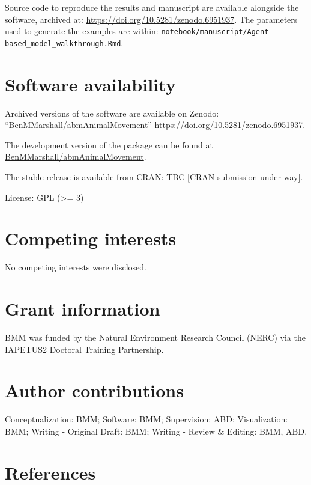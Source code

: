 \documentclass[10pt,a4paper]{article}
\begin{document}
Source code to reproduce the results and manuscript are available alongside the software, archived at: \url{https://doi.org/10.5281/zenodo.6951937}.
The parameters used to generate the examples are within: \texttt{notebook/manuscript/Agent-based\_model\_walkthrough.Rmd}.

\hypertarget{software-availability}{%
\section{Software availability}\label{software-availability}}

Archived versions of the software are available on Zenodo: ``BenMMarshall/abmAnimalMovement'' \url{https://doi.org/10.5281/zenodo.6951937}.

The development version of the package can be found at \href{https://github.com/BenMMarshall/abmAnimalMovement}{BenMMarshall/abmAnimalMovement}.

The stable release is available from CRAN: TBC {[}CRAN submission under way{]}.

License: GPL (\textgreater= 3)

\hypertarget{competing-interests}{%
\section{Competing interests}\label{competing-interests}}

No competing interests were disclosed.

\hypertarget{grant-information}{%
\section{Grant information}\label{grant-information}}

BMM was funded by the Natural Environment Research Council (NERC) via the IAPETUS2 Doctoral Training Partnership.

\hypertarget{author-contributions}{%
\section{Author contributions}\label{author-contributions}}

Conceptualization: BMM;
Software: BMM;
Supervision: ABD;
Visualization: BMM;
Writing - Original Draft: BMM;
Writing - Review \& Editing: BMM, ABD.

\clearpage

\hypertarget{references}{%
\section*{References}\label{references}}
\end{document}
